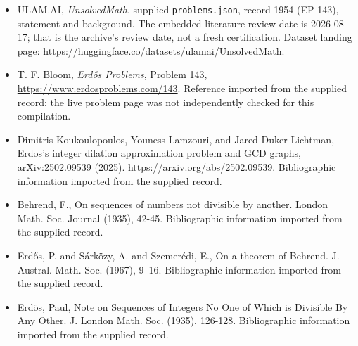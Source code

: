 \documentclass[11pt,a4paper]{article}
\begin{document}
{\small

\begin{itemize}

\item[\hypertarget{source:1954:1}{S1}] ULAM.AI, \emph{UnsolvedMath}, supplied \texttt{problems.json}, record 1954 (EP-143), statement and background. The embedded literature-review date is 2026-08-17; that is the archive’s review date, not a fresh certification. Dataset landing page: \url{https://huggingface.co/datasets/ulamai/UnsolvedMath}.

\item[\hypertarget{source:1954:2}{S2}] T. F. Bloom, \emph{Erdős Problems}, Problem 143, \url{https://www.erdosproblems.com/143}. Reference imported from the supplied record; the live problem page was not independently checked for this compilation.

\item[\hypertarget{source:1954:3}{S3}] Dimitris Koukoulopoulos, Youness Lamzouri, and Jared Duker Lichtman, Erdos's integer dilation approximation problem and GCD graphs, arXiv:2502.09539 (2025). \url{https://arxiv.org/abs/2502.09539}. Bibliographic information imported from the supplied record.

\item[\hypertarget{source:1954:4}{S4}] Behrend, F., On sequences of numbers not divisible by another. London Math. Soc. Journal (1935), 42-45. Bibliographic information imported from the supplied record.

\item[\hypertarget{source:1954:5}{S5}] Erd\H{o}s, P. and S\'{a}rk\"{o}zy, A. and Szemer\'{e}di, E., On a theorem of Behrend. J. Austral. Math. Soc. (1967), 9--16. Bibliographic information imported from the supplied record.

\item[\hypertarget{source:1954:6}{S6}] Erd\"{o}s, Paul, Note on Sequences of Integers No One of Which is Divisible By Any Other. J. London Math. Soc. (1935), 126-128. Bibliographic information imported from the supplied record.

\end{itemize}

}

\label{end:1954}
\end{document}
